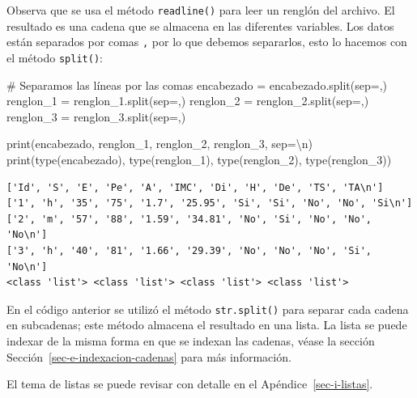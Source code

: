 \documentclass[
  spanish,
  letterpaper,
]{scrbook}
\newenvironment{Shaded}{\begin{snugshade}}{\end{snugshade}}
\newcommand{\BuiltInTok}[1]{\textcolor[rgb]{0.00,0.23,0.31}{#1}}
\newcommand{\CharTok}[1]{\textcolor[rgb]{0.13,0.47,0.30}{#1}}
\newcommand{\CommentTok}[1]{\textcolor[rgb]{0.37,0.37,0.37}{#1}}
\newcommand{\NormalTok}[1]{\textcolor[rgb]{0.00,0.23,0.31}{#1}}
\newcommand{\OperatorTok}[1]{\textcolor[rgb]{0.37,0.37,0.37}{#1}}
\newcommand{\StringTok}[1]{\textcolor[rgb]{0.13,0.47,0.30}{#1}}
\theoremstyle{definition}
\theoremstyle{remark}
\begin{document}
Observa que se usa el método \texttt{readline()} para leer un renglón
del archivo. El resultado es una cadena que se almacena en las
diferentes variables. Los datos están separados por comas \texttt{,} por
lo que debemos separarlos, esto lo hacemos con el método
\texttt{split()}:

\begin{Shaded}
\begin{Highlighting}[]
\CommentTok{\# Separamos las líneas por las comas}
\NormalTok{encabezado }\OperatorTok{=}\NormalTok{ encabezado.split(sep}\OperatorTok{=}\StringTok{\textquotesingle{},\textquotesingle{}}\NormalTok{)}
\NormalTok{renglon\_1 }\OperatorTok{=}\NormalTok{ renglon\_1.split(sep}\OperatorTok{=}\StringTok{\textquotesingle{},\textquotesingle{}}\NormalTok{)}
\NormalTok{renglon\_2 }\OperatorTok{=}\NormalTok{ renglon\_2.split(sep}\OperatorTok{=}\StringTok{\textquotesingle{},\textquotesingle{}}\NormalTok{)}
\NormalTok{renglon\_3 }\OperatorTok{=}\NormalTok{ renglon\_3.split(sep}\OperatorTok{=}\StringTok{\textquotesingle{},\textquotesingle{}}\NormalTok{)}

\BuiltInTok{print}\NormalTok{(encabezado, renglon\_1, renglon\_2, renglon\_3, sep}\OperatorTok{=}\StringTok{\textquotesingle{}}\CharTok{\textbackslash{}n}\StringTok{\textquotesingle{}}\NormalTok{)}
\BuiltInTok{print}\NormalTok{(}\BuiltInTok{type}\NormalTok{(encabezado), }\BuiltInTok{type}\NormalTok{(renglon\_1), }\BuiltInTok{type}\NormalTok{(renglon\_2), }\BuiltInTok{type}\NormalTok{(renglon\_3))}
\end{Highlighting}
\end{Shaded}

\begin{verbatim}
['Id', 'S', 'E', 'Pe', 'A', 'IMC', 'Di', 'H', 'De', 'TS', 'TA\n']
['1', 'h', '35', '75', '1.7', '25.95', 'Si', 'Si', 'No', 'No', 'Si\n']
['2', 'm', '57', '88', '1.59', '34.81', 'No', 'Si', 'No', 'No', 'No\n']
['3', 'h', '40', '81', '1.66', '29.39', 'No', 'No', 'No', 'Si', 'No\n']
<class 'list'> <class 'list'> <class 'list'> <class 'list'>
\end{verbatim}

En el código anterior se utilizó el método \texttt{str.split()} para
separar cada cadena en subcadenas; este método almacena el resultado en
una lista. La lista se puede indexar de la misma forma en que se indexan
las cadenas, véase la sección Sección~\ref{sec-e-indexacion-cadenas}
para más información.

El tema de listas se puede revisar con detalle en el
Apéndice~\ref{sec-i-listas}.
\end{document}
